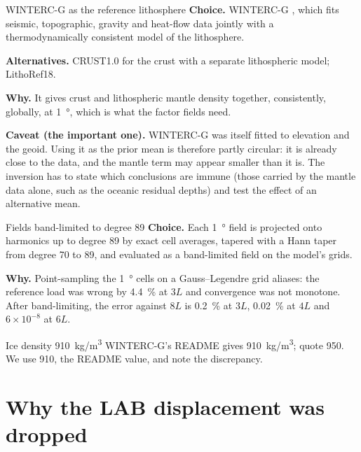 \begin{decision}{WINTERC-G as the reference lithosphere}
\textbf{Choice.} WINTERC-G \citep{fullea_winterc_2021}, which fits seismic, topographic, gravity and heat-flow data jointly with a thermodynamically consistent model of the lithosphere.

\textbf{Alternatives.} CRUST1.0 \citep{laske_crust1_2013} for the crust with a separate lithospheric model; LithoRef18.

\textbf{Why.} It gives crust and lithospheric mantle density together, consistently, globally, at \qty{1}{\degree}, which is what the factor fields need.

\textbf{Caveat (the important one).} WINTERC-G was itself fitted to elevation and the geoid.
Using it as the prior mean is therefore partly circular: it is already close to the data, and the mantle term may appear smaller than it is.
The inversion has to state which conclusions are immune (those carried by the mantle data alone, such as the oceanic residual depths) and test the effect of an alternative mean.
\end{decision}

\begin{decision}{Fields band-limited to degree 89}
\textbf{Choice.} Each \qty{1}{\degree} field is projected onto harmonics up to degree 89 by exact cell averages, tapered with a Hann taper from degree 70 to 89, and evaluated as a band-limited field on the model's grids.

\textbf{Why.} Point-sampling the \qty{1}{\degree} cells on a Gauss--Legendre grid aliases: the reference load was wrong by \qty{4.4}{\percent} at $3L$ and convergence was not monotone.
After band-limiting, the error against $8L$ is \qty{0.2}{\percent} at $3L$, \qty{0.02}{\percent} at $4L$ and $6\times10^{-8}$ at $6L$.
\end{decision}

\begin{decision}{Ice density \qty{910}{kg/m^3}}
WINTERC-G's README gives \qty{910}{kg/m^3}; \citet{fullea_winterc_2021} quote 950.
We use 910, the README value, and note the discrepancy.
\end{decision}

\section{Why the LAB displacement was dropped}

